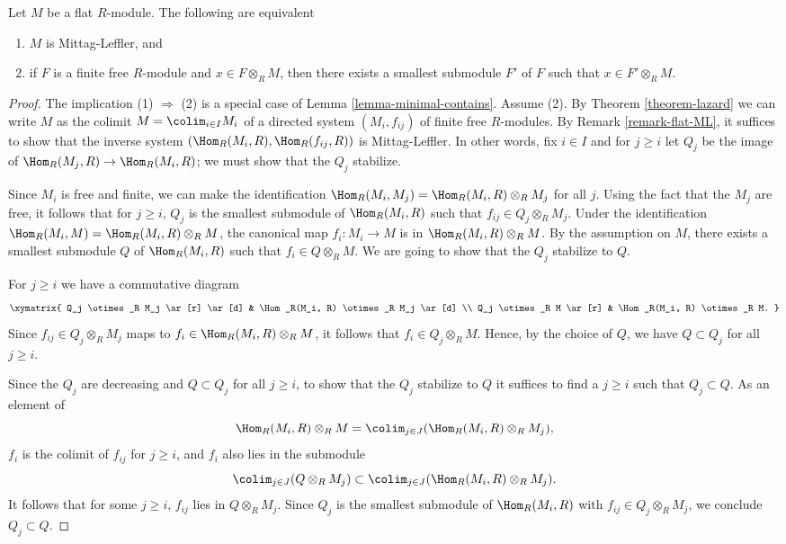 \begin{lemma}
\label{lemma-flat-ML-criterion}
Let $M$ be a flat $R$-module. The following are equivalent
\begin{enumerate}
\item $M$ is Mittag-Leffler, and
\item if $F$ is a finite free $R$-module and
$x \in F \otimes_R M$, then there exists a smallest submodule $F'$ of $F$
such that $x \in F' \otimes_R M$.
\end{enumerate}
\end{lemma}

\begin{proof}
The implication (1) $\Rightarrow$ (2) is a special case of
Lemma \ref{lemma-minimal-contains}. Assume (2).
By Theorem \ref{theorem-lazard} we can write $M$ as the colimit
$M = \colim_{i \in I} M_i$ of a directed system $(M_i, f_{ij})$ of
finite free $R$-modules.
By Remark \ref{remark-flat-ML}, it suffices to show that the inverse system
$(\Hom_R(M_i, R), \Hom_R(f_{ij}, R))$ is Mittag-Leffler.  In
other words,
fix $i \in I$ and for $j \geq i$ let $Q_j$ be the image of
$\Hom_R(M_j, R)
\to \Hom_R(M_i, R)$; we must show that the $Q_j$ stabilize.

\medskip\noindent
Since $M_i$ is free and finite, we can make the identification
$\Hom_R(M_i, M_j) = \Hom_R(M_i, R) \otimes_R  M_j$ for all $j$.
 Using the
fact that the $M_j$ are free, it follows that for $j \geq i$, $Q_j$ is the
smallest submodule of $\Hom_R(M_i, R)$ such that $f_{ij} \in Q_j
\otimes_R
M_j$.  Under the identification $\Hom_R(M_i, M) = \Hom_R(M_i, R)
\otimes_R
M$, the canonical map $f_i: M_i \to M$ is in $\Hom_R(M_i, R)
\otimes_R M$.  By the assumption on $M$, there exists a smallest submodule
$Q$ of $\Hom_R(M_i, R)$ such that $f_i \in Q \otimes_R M$.  We are
going to
show that the $Q_j$ stabilize to $Q$.

\medskip\noindent
For $j \geq i$ we have a commutative diagram
$$
\xymatrix{
Q_j \otimes_R M_j \ar[r] \ar[d] & \Hom_R(M_i, R) \otimes_R M_j
\ar[d] \\
Q_j \otimes_R M \ar[r] & \Hom_R(M_i, R) \otimes_R M.
}
$$
Since $f_{ij} \in Q_j \otimes_R M_j$ maps to $f_i \in \Hom_R(M_i, R)
\otimes_R M$, it follows that $f_i \in Q_j \otimes_R M$.  Hence, by the
choice of $Q$, we have $Q \subset Q_j$ for all $j \geq i$.

\medskip\noindent
Since the $Q_j$ are decreasing and $Q \subset Q_j$ for all $j \geq i$, to show
that the $Q_j$ stabilize to $Q$ it suffices to find a $j \geq i$ such that $Q_j
\subset Q$.  As an element of
$$
\Hom_R(M_i, R) \otimes_R M = \colim_{j \in J}
(\Hom_R(M_i, R) \otimes_R
M_j),
$$
$f_i$ is the colimit of $f_{ij}$ for $j \geq i$, and $f_i$ also lies in the
submodule
$$
\colim_{j \in J} (Q \otimes_R M_j) \subset \colim_{j \in J}
(\Hom_R(M_i, R)
\otimes_R M_j).
$$
It follows that for some $j \geq i$, $f_{ij}$ lies in $Q \otimes_R M_j$.
Since $Q_j$ is the smallest submodule of $\Hom_R(M_i, R)$ with $f_{ij}
\in
Q_j \otimes_R M_j$, we conclude $Q_j\subset Q$.
\end{proof}
